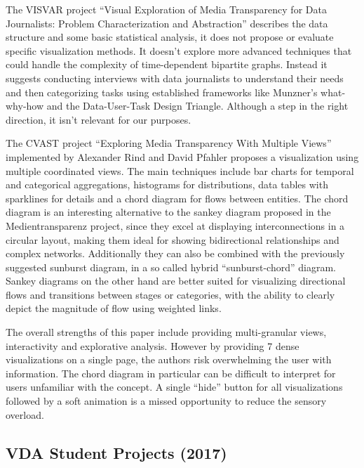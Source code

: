 \documentclass{vgtc}                          %
\begin{document}
\medskip

The VISVAR project ``Visual Exploration of Media Transparency for Data Journalists: Problem Characterization and Abstraction'' \cite{aigner2016visual} describes the data structure and some basic statistical analysis, it does not propose or evaluate specific visualization methods. It doesn't explore more advanced techniques that could handle the complexity of time-dependent bipartite graphs. Instead it suggests conducting interviews with data journalists to understand their needs and then categorizing tasks using established frameworks like Munzner's what-why-how and the Data-User-Task Design Triangle. Although a step in the right direction, it isn't relevant for our purposes.

\medskip

The CVAST project ``Exploring Media Transparency With Multiple Views'' \cite{rind2016exploring} implemented by Alexander Rind and David Pfahler \cite{gitmtdb2} proposes a visualization using multiple coordinated views. The main techniques include bar charts for temporal and categorical aggregations, histograms for distributions, data tables with sparklines for details and a chord diagram for flows between entities. The chord diagram is an interesting alternative to the sankey diagram proposed in the Medientransparenz project, since they excel at displaying interconnections in a circular layout, making them ideal for showing bidirectional relationships and complex networks. Additionally they can also be combined with the previously suggested sunburst diagram, in a so called hybrid ``sunburst-chord'' diagram. Sankey diagrams on the other hand are better suited for visualizing directional flows and transitions between stages or categories, with the ability to clearly depict the magnitude of flow using weighted links.

The overall strengths of this paper include providing multi-granular views, interactivity and explorative analysis. However by providing 7 dense visualizations on a single page, the authors risk overwhelming the user with information. The chord diagram in particular can be difficult to interpret for users unfamiliar with the concept. A single ``hide'' button for all visualizations followed by a soft animation is a missed opportunity to reduce the sensory overload.

\subsection{VDA Student Projects (2017)}
\end{document}
